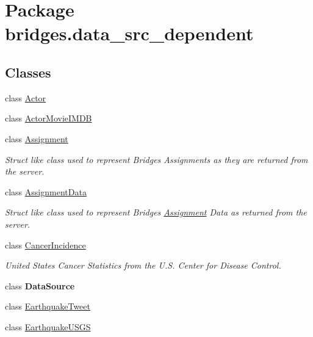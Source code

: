 \hypertarget{namespacebridges_1_1data__src__dependent}{}\section{Package bridges.\+data\+\_\+src\+\_\+dependent}
\label{namespacebridges_1_1data__src__dependent}
\subsection*{Classes}
\begin{DoxyCompactItemize}
\item 
class \hyperlink{classbridges_1_1data__src__dependent_1_1_actor}{Actor}
\item 
class \hyperlink{classbridges_1_1data__src__dependent_1_1_actor_movie_i_m_d_b}{Actor\+Movie\+I\+M\+DB}
\item 
class \hyperlink{classbridges_1_1data__src__dependent_1_1_assignment}{Assignment}
\begin{DoxyCompactList}\small\item\em Struct like class used to represent Bridges Assignments as they are returned from the server. \end{DoxyCompactList}\item 
class \hyperlink{classbridges_1_1data__src__dependent_1_1_assignment_data}{Assignment\+Data}
\begin{DoxyCompactList}\small\item\em Struct like class used to represent Bridges \hyperlink{classbridges_1_1data__src__dependent_1_1_assignment}{Assignment} Data as returned from the server. \end{DoxyCompactList}\item 
class \hyperlink{classbridges_1_1data__src__dependent_1_1_cancer_incidence}{Cancer\+Incidence}
\begin{DoxyCompactList}\small\item\em United States Cancer Statistics from the U.\+S. Center for Disease Control. \end{DoxyCompactList}\item 
class {\bfseries Data\+Source}
\item 
class \hyperlink{classbridges_1_1data__src__dependent_1_1_earthquake_tweet}{Earthquake\+Tweet}
\item 
class \hyperlink{classbridges_1_1data__src__dependent_1_1_earthquake_u_s_g_s}{Earthquake\+U\+S\+GS}
\item 

\end{DoxyCompactItemize}
